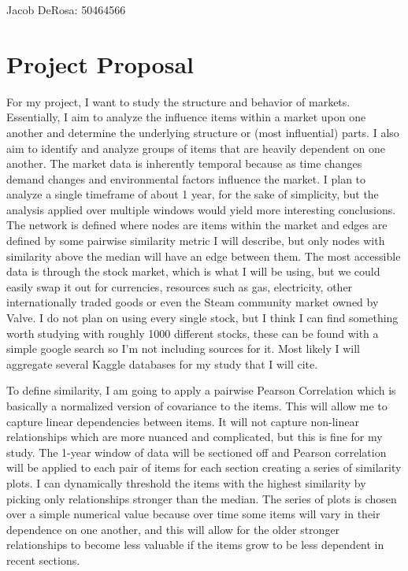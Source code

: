 \documentclass[a4paper,12pt]{article}%
\begin{document}
Jacob DeRosa: 50464566

\section{Project Proposal}
For my project, I want to study the structure and behavior of markets. Essentially, I aim to analyze the influence items within a market upon one another and determine the underlying structure or (most influential) parts. I also aim to identify and analyze groups of items that are heavily dependent on one another. The market data is inherently temporal because as time changes demand changes and environmental factors influence the market. I plan to analyze a single timeframe of about 1 year, for the sake of simplicity, but the analysis applied over multiple windows would yield more interesting conclusions. The network is defined where nodes are items within the market and edges are defined by some pairwise similarity metric I will describe, but only nodes with similarity above the median will have an edge between them. The most accessible data is through the stock market, which is what I will be using, but we could easily swap it out for currencies, resources such as gas, electricity, other internationally traded goods or even the Steam community market owned by Valve. I do not plan on using every single stock, but I think I can find something worth studying with roughly 1000 different stocks, these can be found with a simple google search so I’m not including sources for it. Most likely I will aggregate several Kaggle databases for my study that I will cite. 

To define similarity, I am going to apply a pairwise Pearson Correlation which is basically a normalized version of covariance to the items. This will allow me to capture linear dependencies between items. It will not capture non-linear relationships which are more nuanced and complicated, but this is fine for my study. The 1-year window of data will be sectioned off and Pearson correlation will be applied to each pair of items for each section creating a series of similarity plots. I can dynamically threshold the items with the highest similarity by picking only relationships stronger than the median. The series of plots is chosen over a simple numerical value because over time some items will vary in their dependence on one another, and this will allow for the older stronger relationships to become less valuable if the items grow to be less dependent in recent sections. 
\end{document}
